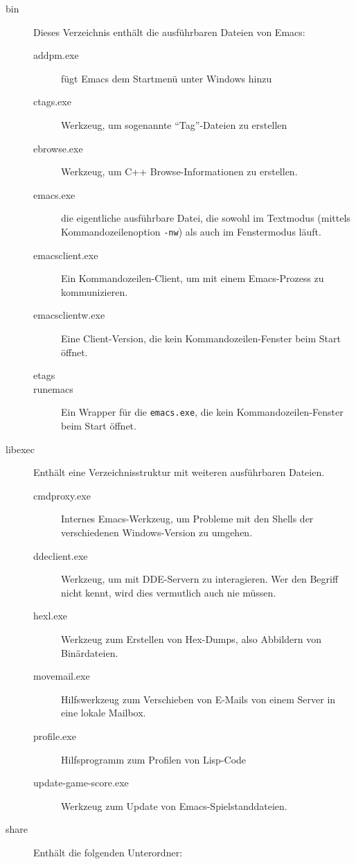 \documentclass[12pt,ngerman]{scrbook}
\begin{document}
\begin{description}
\item[bin] Dieses Verzeichnis enthält die ausführbaren Dateien von Emacs:

\begin{description}
\item[addpm.exe] fügt Emacs dem Startmenü unter Windows hinzu
\item[ctags.exe] Werkzeug, um sogenannte \enquote{Tag}-Dateien zu erstellen 
\item[ebrowse.exe] Werkzeug, um C++ Browse-Informationen zu erstellen.
\item[emacs.exe] die eigentliche ausführbare Datei, die sowohl im Textmodus (mittels Kommandozeilenoption \texttt{-nw}) als auch im Fenstermodus läuft. 
\item[emacsclient.exe] Ein Kommandozeilen-Client, um mit einem Emacs-Prozess zu kommunizieren.
\item[emacsclientw.exe] Eine Client-Version, die kein Kommandozeilen-Fenster beim Start öffnet.
\item[etags]
\item[runemacs] Ein Wrapper für die \texttt{emacs.exe}, die kein Kommandozeilen-Fenster beim Start öffnet.
\end{description}


\item[libexec] Enthält eine Verzeichnisstruktur mit weiteren ausführbaren Dateien.

\begin{description}
\item[cmdproxy.exe] Internes Emacs-Werkzeug, um Probleme mit den Shells der verschiedenen Windows-Version zu umgehen.
\item[ddeclient.exe] Werkzeug, um mit DDE-Servern zu interagieren. Wer den Begriff nicht kennt, wird dies vermutlich auch nie müssen.
\item[hexl.exe] Werkzeug zum Erstellen von Hex-Dumps, also Abbildern von Binärdateien.
\item[movemail.exe] Hilfswerkzeug zum Verschieben von E-Mails von einem Server in eine lokale Mailbox.
\item[profile.exe] Hilfsprogramm zum Profilen von Lisp-Code
\item[update-game-score.exe] Werkzeug zum Update von Emacs-Spielstanddateien.
\end{description}

\item[share] Enthält die folgenden Unterordner:


\end{description}
\end{document}
